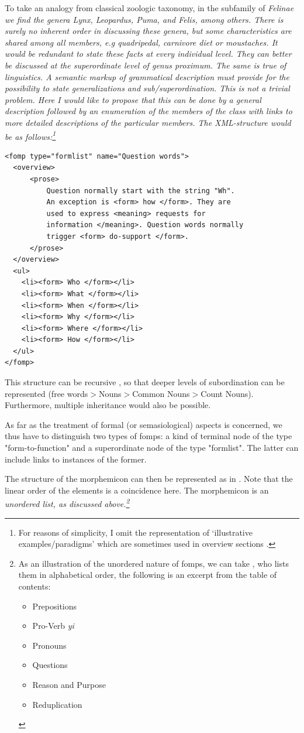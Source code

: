 \documentclass[a4paper,12pt]{article}
\begin{document}
To take an analogy from classical zoologic taxonomy, in the subfamily of \em Felinae \em we find the genera \em Lynx, Leopardus, Puma, \em and \em Felis\em, among others. There is surely no inherent order in discussing these genera, but some characteristics are shared among all members, e.g quadripedal, carnivore diet or moustaches. It would be redundant to state these facts at every individual level. They can better be discussed at the superordinate level of \em genus proximum\em. The same is true of linguistics. A semantic markup of grammatical description must provide for the possibility to state generalizations and sub/superordination. This is not a trivial problem. Here I would like to propose that this can be done by a general description followed by an enumeration of the members of the class with links to more detailed descriptions of the particular members. The XML-structure would be as follows:\footnote{For reasons of simplicity, I omit the representation of `illustrative examples/paradigms' which are sometimes used in overview sections \citep{Good2004}.}

\ea\label{xml:formlist}
\begin{verbatim}
<fomp type="formlist" name="Question words">
  <overview>
      <prose>
          Question normally start with the string "Wh".
          An exception is <form> how </form>. They are
          used to express <meaning> requests for
          information </meaning>. Question words normally
          trigger <form> do-support </form>.
      </prose>
  </overview>
  <ul>
    <li><form> Who </form></li>
    <li><form> What </form></li>
    <li><form> When </form></li>
    <li><form> Why </form></li>
    <li><form> Where </form></li>
    <li><form> How </form></li>
  </ul>
</fomp>
\end{verbatim}
\z

This structure can be recursive \citep{Good2004}, so that deeper levels of subordination can be represented (free words$>$Nouns$>$Common Nouns$>$Count Nouns). Furthermore, multiple inheritance would also be possible.

As far as the treatment of formal (or semasiological) aspects is concerned, we thus have to distinguish two types of fomps: a kind of  terminal node of the type "form-to-function" and a superordinate node of the type "formlist". The latter can include links to instances of the former.

The structure of the morphemicon can then be represented as in . Note that the linear order of the elements is a coincidence here. The morphemicon is an \em un\em ordered list, as discussed above.\footnote{As an illustration of the unordered nature of fomps, we can take \citet{Newman2000}, who lists them in alphabetical order, the following is an excerpt from the table of contents:
\begin{itemize}
 \item Prepositions
 \item Pro-Verb \em yi\em
 \item Pronouns
 \item Questions
 \item Reason and Purpose
 \item Reduplication
\end{itemize}
}	
\end{document}
